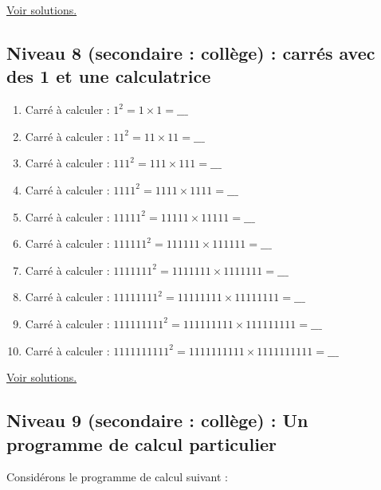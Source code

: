 \documentclass[11pt]{article}
\begin{document}
\hyperref[org7dc1f19]{Voir solutions.}







\newpage

\subsection{Niveau 8 (secondaire : collège) : carrés avec des 1 et une calculatrice}
\label{sec:org8247af8}


\label{org8362719}


\begin{enumerate}
\item Carré à calculer :  \(1^2 = 1 \times 1 =  \_\_\_\)
\item Carré à calculer :  \(11^2 = 11 \times 11 = \_\_\_\)
\item Carré à calculer :  \(111^2 = 111 \times 111 = \_\_\_\)
\item Carré à calculer :  \(1111^2 = 1111 \times 1111 = \_\_\_\)
\item Carré à calculer :  \(11111^2 = 11111 \times 11111 = \_\_\_\)
\item Carré à calculer :  \(111111^2 = 111111 \times 111111 = \_\_\_\)
\item Carré à calculer :  \(1111111^2 = 1111111 \times 1111111 = \_\_\_\)
\item Carré à calculer :  \(11111111^2 = 11111111 \times 11111111 = \_\_\_\)
\item Carré à calculer :  \(111111111^2 = 111111111 \times 111111111 = \_\_\_\)
\item Carré à calculer :  \(1111111111^2 = 1111111111 \times 1111111111 = \_\_\_\)
\end{enumerate}



\hyperref[orgd694eea]{Voir solutions.}





\newpage

\subsection{Niveau 9 (secondaire : collège) : Un programme de calcul particulier}
\label{sec:orgac005a2}

\label{org966c153}

Considérons le programme de calcul suivant :
\end{document}
